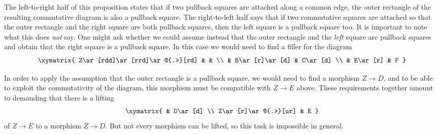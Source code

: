 \documentclass[12pt]{article}
\begin{document}
The left-to-right half of this proposition states that if two
pullback squares are attached along a common edge, the outer rectangle
of the resulting commutative diagram is also a pullback square.  The
right-to-left half says that if two commutative squares are attached
so that the outer rectangle and the right square are both pullback
squares, then the left square is a pullback square too.  It is
important to note what this does \emph{not} say.  One might ask
whether we could assume instead that the outer rectangle and the
\emph{left} square are pullback squares and obtain that the right
square is a pullback square.  In this case we would need to find a
filler for the diagram
\[\xymatrix{
Z\ar[rdd]\ar[rrd]\ar@{.>}[rd] &               &         \\
                              & B\ar[r]\ar[d] & C\ar[d] \\
                              & E\ar[r]       & F
}\]

In order to apply the assumption that the outer rectangle is a
pullback square, we would need to find a morphism $Z\to D$, and to be
able to exploit the commutativity of the diagram, this morphism must
be compatible with $Z\to E$ above.  These requirements together amount
to demanding that there is a lifting 
\[\xymatrix{
                    & D\ar[d] \\
Z\ar[r]\ar@{.>}[ur] & E
}\]
of $Z\to E$ to a morphism $Z\to D$.  But not every morphism can be
lifted, so this task is impossible in general.


\end{document}
